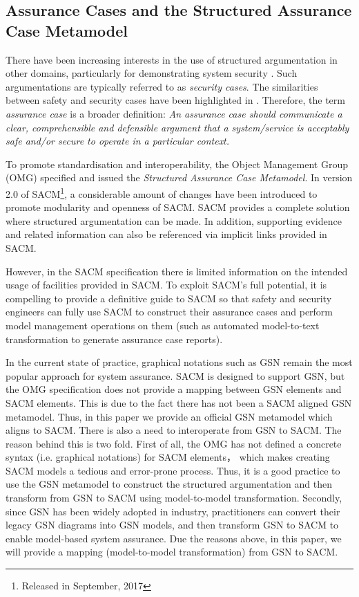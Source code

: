 \subsection{Assurance Cases and the Structured Assurance Case Metamodel}
There have been increasing interests in the use of structured argumentation in other domains, particularly for demonstrating system security \cite{bloomfield2010safety}. Such argumentations are typically referred to as \textit{security cases}. The similarities between safety and security cases have been highlighted in \cite{lautieri2005safsec}. Therefore, the term \textit{assurance case} is a broader definition: \textit{An assurance case should communicate a clear, comprehensible and defensible argument that a system/service is acceptably safe and/or secure to operate in a particular context.} 

To promote standardisation and interoperability, the Object Management Group (OMG) specified and issued the \textit{Structured Assurance Case Metamodel}. In version 2.0 of SACM\footnote{Released in September, 2017}, a considerable amount of changes have been introduced to promote modularity and openness of SACM. SACM provides a complete solution where structured argumentation can be made. In addition, supporting evidence and related information can also be referenced via implicit links provided in SACM.

However, in the SACM specification there is limited information on the intended usage of facilities provided in SACM. To exploit SACM's full potential, it is compelling to provide a definitive guide to SACM so that safety and security engineers can fully use SACM to construct their assurance cases and perform model management operations on them (such as automated model-to-text transformation to generate assurance case reports). 

In the current state of practice, graphical notations such as GSN remain the most popular approach for system assurance. 
SACM is designed to support GSN, but the OMG specification does not provide a mapping between GSN elements and SACM elements. 
This is due to the fact there has not been a SACM aligned GSN metamodel. 
Thus, in this paper we provide an official GSN metamodel which aligns to SACM. 
There is also a need to interoperate from GSN to SACM.
The reason behind this is two fold. First of all, the OMG has not defined a concrete syntax (i.e. graphical notations) for SACM elements， which makes creating SACM models a tedious and error-prone process. Thus, it is a good practice to use the GSN metamodel to construct the structured argumentation and then transform from GSN to SACM using model-to-model transformation. Secondly, since GSN has been widely adopted in industry, practitioners can convert their legacy GSN diagrams into GSN models, and then transform GSN to SACM to enable model-based system assurance. 
Due the reasons above, in this paper, we will provide a mapping (model-to-model transformation) from GSN to SACM.

